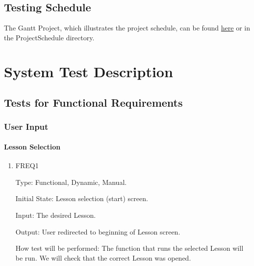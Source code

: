 \documentclass[12pt, titlepage]{article}
\begin{document}
\subsection{Testing Schedule}
\label{sec:ts}
		
The Gantt Project, which illustrates the project schedule, can be found \href{run:../../ProjectSchedule/Gantt_Project.gan}{here} or in the ProjectSchedule directory. 

\section{System Test Description}
	
\subsection{Tests for Functional Requirements}

\subsubsection{User Input}
		
\paragraph{Lesson Selection}

\begin{enumerate}

\item{FREQ1\\}

Type: Functional, Dynamic, Manual.
					
Initial State: Lesson selection (start) screen.
					
Input: The desired Lesson.
					
Output: User redirected to beginning of Lesson screen.
					
How test will be performed: The function that runs the selected Lesson will be run. We will check that the correct Lesson was opened.

\end{enumerate}
\end{document}
